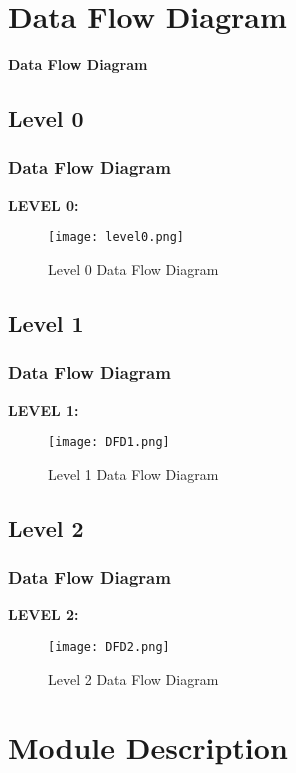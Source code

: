 \documentclass{beamer}
\begin{document}
\section{Data Flow Diagram}
\begin{frame}
\begin{center}
    \huge \textbf{Data Flow Diagram}
\end{center}
\end{frame}
\subsection{Level 0}
\begin{frame}
\frametitle{Data Flow Diagram}
\textbf{LEVEL 0:}
\begin{figure}
    \texttt{[image: level0.png]}
    \caption{Level 0 Data Flow Diagram}
\end{figure}
\end{frame}


\subsection{Level 1}
\begin{frame}
\frametitle{Data Flow Diagram}
\textbf{LEVEL 1:}
\begin{figure}
    \texttt{[image: DFD1.png]}
    \caption{Level 1 Data Flow Diagram}
\end{figure}
\end{frame}

\subsection{Level 2}
\begin{frame}
\frametitle{Data Flow Diagram}
\textbf{LEVEL 2:}
\begin{figure}
    \texttt{[image: DFD2.png]}
    \caption{Level 2 Data Flow Diagram}
\end{figure}
\end{frame}

\section{Module Description}
\end{document}
